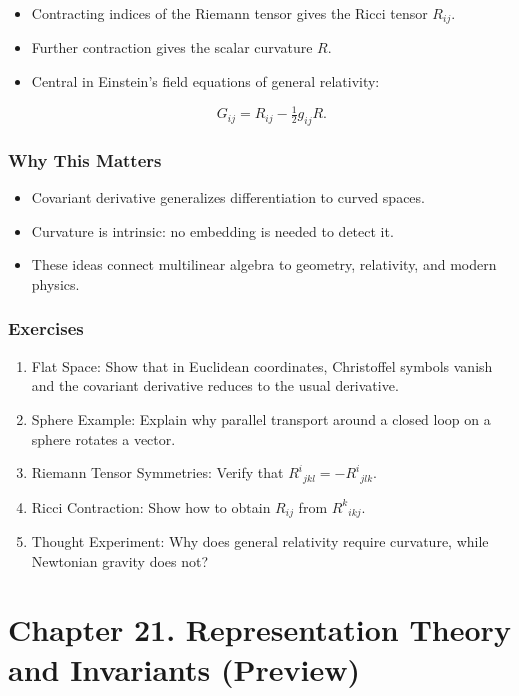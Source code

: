 \documentclass[
  letterpaper,
  DIV=11,
  numbers=noendperiod]{scrreprt}
\providecommand{\tightlist}{%
  \setlength{\itemsep}{0pt}\setlength{\parskip}{0pt}}
\begin{document}
\begin{itemize}
\item
  Contracting indices of the Riemann tensor gives the Ricci tensor
  \(R_{ij}\).
\item
  Further contraction gives the scalar curvature \(R\).
\item
  Central in Einstein's field equations of general relativity:

  \[
  G_{ij} = R_{ij} - \tfrac{1}{2} g_{ij} R.
  \]
\end{itemize}

\subsubsection{Why This Matters}\label{why-this-matters-57}

\begin{itemize}
\tightlist
\item
  Covariant derivative generalizes differentiation to curved spaces.
\item
  Curvature is intrinsic: no embedding is needed to detect it.
\item
  These ideas connect multilinear algebra to geometry, relativity, and
  modern physics.
\end{itemize}

\subsubsection{Exercises}\label{exercises-71}

\begin{enumerate}
\def\labelenumi{\arabic{enumi}.}
\item
  Flat Space: Show that in Euclidean coordinates, Christoffel symbols
  vanish and the covariant derivative reduces to the usual derivative.
\item
  Sphere Example: Explain why parallel transport around a closed loop on
  a sphere rotates a vector.
\item
  Riemann Tensor Symmetries: Verify that \(R^i{}_{jkl} = -R^i{}_{jlk}\).
\item
  Ricci Contraction: Show how to obtain \(R_{ij}\) from \(R^k{}_{ikj}\).
\item
  Thought Experiment: Why does general relativity require curvature,
  while Newtonian gravity does not?
\end{enumerate}

\section{Chapter 21. Representation Theory and Invariants
(Preview)}\label{chapter-21.-representation-theory-and-invariants-preview}
\end{document}
